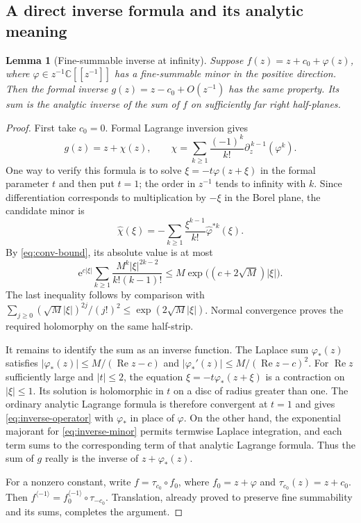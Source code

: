 \documentclass[11pt,a4paper]{article}
\numberwithin{equation}{section}
\newtheorem{lemma}[theorem]{Lemma}
\theoremstyle{definition}
\theoremstyle{remark}
\newcommand{\C}{\mathbb C}
\newcommand{\ee}{\mathrm e}
\newcommand{\Ree}{\operatorname{Re}}
\newcommand{\inv}{\langle-1\rangle}
\begin{document}
\subsection{A direct inverse formula and its analytic meaning}
\begin{lemma}[Fine-summable inverse at infinity]
\label{lem:fineinverse}
Suppose $f(z)=z+c_0+\varphi(z)$, where $\varphi\in z^{-1}\C[[z^{-1}]]$
has a fine-summable minor in the positive direction.  Then the formal
inverse $g(z)=z-c_0+O(z^{-1})$ has the same property.  Its sum is the
analytic inverse of the sum of $f$ on sufficiently far right half-planes.
\end{lemma}
\begin{proof}
First take $c_0=0$.  Formal Lagrange inversion gives
\begin{equation}
 g(z)=z+\chi(z),\qquad
 \chi=\sum_{k\ge1}\frac{(-1)^k}{k!}
                       \partial_z^{\,k-1}(\varphi^k).
 \label{eq:inverse-operator}
\end{equation}
One way to verify this formula is to solve
$\xi=-t\varphi(z+\xi)$ in the formal parameter $t$ and then put $t=1$;
the order in $z^{-1}$ tends to infinity with $k$.
Since differentiation corresponds to multiplication by $-\xi$ in the
Borel plane, the candidate minor is
\begin{equation}
 \widehat\chi(\xi)
 =-\sum_{k\ge1}\frac{\xi^{k-1}}{k!}
                          \widehat\varphi^{*k}(\xi).
 \label{eq:inverse-minor}
\end{equation}
By \eqref{eq:conv-bound}, its absolute value is at most
\[
 \ee^{c|\xi|}\sum_{k\ge1}
        \frac{M^k|\xi|^{2k-2}}{k!(k-1)!}
 \le M\exp\bigl((c+2\sqrt M)|\xi|\bigr).
\]
The last inequality follows by comparison with
$\sum_{j\ge0}(\sqrt M|\xi|)^{2j}/(j!)^2\le
\exp(2\sqrt M|\xi|)$.  Normal convergence proves the required
holomorphy on the same half-strip.

It remains to identify the sum as an inverse function.  The Laplace
sum $\varphi_*(z)$ satisfies
$|\varphi_*(z)|\le M/(\Ree z-c)$ and
$|\varphi_*'(z)|\le M/(\Ree z-c)^2$.
For $\Ree z$ sufficiently large and $|t|\le2$, the equation
$\xi=-t\varphi_*(z+\xi)$ is a contraction on $|\xi|\le1$.
Its solution is holomorphic in $t$ on a disc of radius greater than one.
The ordinary analytic Lagrange formula is therefore convergent at $t=1$
and gives \eqref{eq:inverse-operator} with $\varphi_*$ in place of
$\varphi$.  On the other hand, the exponential majorant for
\eqref{eq:inverse-minor} permits termwise Laplace integration, and each
term sums to the corresponding term of that analytic Lagrange formula.
Thus the sum of $g$ really is the inverse of $z+\varphi_*(z)$.

For a nonzero constant, write $f=\tau_{c_0}\circ f_0$, where
$f_0=z+\varphi$ and $\tau_{c_0}(z)=z+c_0$.
Then $f^{\inv}=f_0^{\inv}\circ\tau_{-c_0}$.  Translation, already
proved to preserve fine summability and its sums, completes the argument.
\end{proof}
\end{document}
